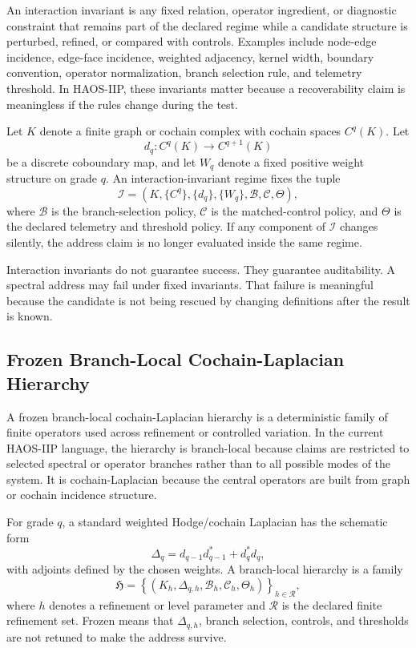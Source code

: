 \documentclass[11pt]{article}
\begin{document}
An interaction invariant is any fixed relation, operator ingredient, or diagnostic constraint that remains part of the declared regime while a candidate structure is perturbed, refined, or compared with controls. Examples include node-edge incidence, edge-face incidence, weighted adjacency, kernel width, boundary convention, operator normalization, branch selection rule, and telemetry threshold. In HAOS-IIP, these invariants matter because a recoverability claim is meaningless if the rules change during the test.

Let \(K\) denote a finite graph or cochain complex with cochain spaces \(C^q(K)\). Let
\[
d_q:C^q(K)\rightarrow C^{q+1}(K)
\]
be a discrete coboundary map, and let \(W_q\) denote a fixed positive weight structure on grade \(q\). An interaction-invariant regime fixes the tuple
\[
\mathcal{I}
=
\left(K,\{C^q\},\{d_q\},\{W_q\},\mathcal{B},\mathcal{C},\Theta\right),
\]
where \(\mathcal{B}\) is the branch-selection policy, \(\mathcal{C}\) is the matched-control policy, and \(\Theta\) is the declared telemetry and threshold policy. If any component of \(\mathcal{I}\) changes silently, the address claim is no longer evaluated inside the same regime.

Interaction invariants do not guarantee success. They guarantee auditability. A spectral address may fail under fixed invariants. That failure is meaningful because the candidate is not being rescued by changing definitions after the result is known.

\subsection{Frozen Branch-Local Cochain-Laplacian Hierarchy}

A frozen branch-local cochain-Laplacian hierarchy is a deterministic family of finite operators used across refinement or controlled variation. In the current HAOS-IIP language, the hierarchy is branch-local because claims are restricted to selected spectral or operator branches rather than to all possible modes of the system. It is cochain-Laplacian because the central operators are built from graph or cochain incidence structure.

For grade \(q\), a standard weighted Hodge/cochain Laplacian has the schematic form
\[
\Delta_q
=
d_{q-1}d_{q-1}^{\ast}
+
d_q^{\ast}d_q,
\]
with adjoints defined by the chosen weights. A branch-local hierarchy is a family
\[
\mathfrak{H}
=
\left\{
(K_h,\Delta_{q,h},\mathcal{B}_h,\mathcal{C}_h,\Theta_h)
\right\}_{h\in\mathcal{R}},
\]
where \(h\) denotes a refinement or level parameter and \(\mathcal{R}\) is the declared finite refinement set. Frozen means that \(\Delta_{q,h}\), branch selection, controls, and thresholds are not retuned to make the address survive.
\end{document}
